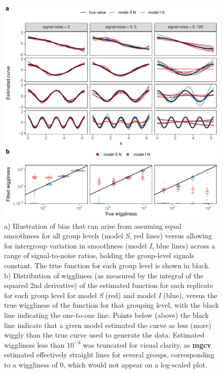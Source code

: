 \documentclass[12pt]{article}
\begin{document}
\begin{figure}
\centering
\includegraphics{../figures/single_smooth_bias_plot-1.pdf}
\caption{\label{fig:var_pen} a) Illustration of bias that can arise from
assuming equal smoothness for all group levels (model \emph{S}, red
lines) versus allowing for intergroup variation in smoothness (model
\emph{I}, blue lines) across a range of signal-to-noise ratios, holding
the group-level signals constant. The true function for each group level
is shown in black. b) Distribution of wiggliness (as measured by the
integral of the squared 2nd derivative) of the estimated function for
each replicate for each group level for model \emph{S} (red) and model
\emph{I} (blue), versus the true wiggliness of the function for that
grouping level, with the black line indicating the one-to-one line.
Points below (above) the black line indicate that a given model
estimated the curve as less (more) wiggly than the true curve used to
generate the data. Estimated wiggliness less than \(10^{-3}\) was
truncated for visual clarity, as \textbf{mgcv} estimated effectively
straight lines for several groups, corresponding to a wiggliness of 0,
which would not appear on a log-scaled plot.}
\end{figure}
\end{document}
